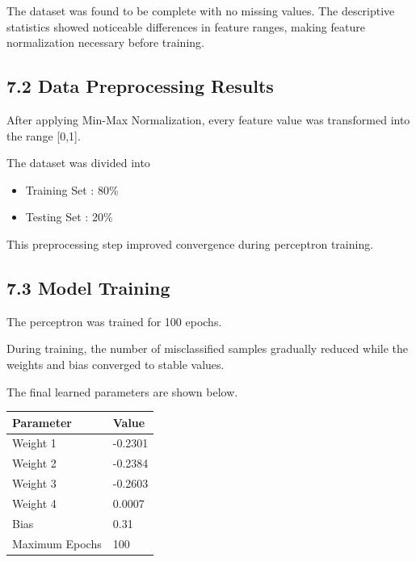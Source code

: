 \documentclass[11pt,a4paper]{article}
\begin{document}
\vspace{0.15cm}

The dataset was found to be complete with no missing values. The descriptive statistics showed noticeable differences in feature ranges, making feature normalization necessary before training.



\subsection*{7.2 Data Preprocessing Results}

After applying Min-Max Normalization, every feature value was transformed into the range [0,1].

The dataset was divided into

\begin{itemize}
\item Training Set : 80\%
\item Testing Set : 20\%
\end{itemize}

This preprocessing step improved convergence during perceptron training.



\subsection*{7.3 Model Training}

The perceptron was trained for 100 epochs.

During training, the number of misclassified samples gradually reduced while the weights and bias converged to stable values.

The final learned parameters are shown below.

\vspace{0.15cm}

\begin{center}
\begin{tabular}{|p{6cm}|p{6cm}|}
\hline
\textbf{Parameter} & \textbf{Value}\\
\hline
Weight 1 & -0.2301\\
\hline
Weight 2 & -0.2384\\
\hline
Weight 3 & -0.2603\\
\hline
Weight 4 & 0.0007\\
\hline
Bias & 0.31\\
\hline
Maximum Epochs & 100\\
\hline
\end{tabular}
\end{center}
\end{document}
